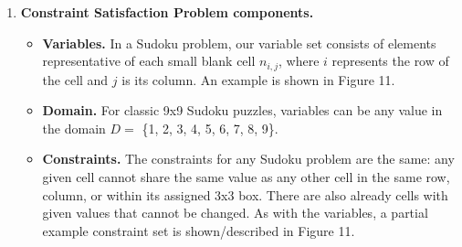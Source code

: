\documentclass[12pt]{article}
\begin{document}
\begin{enumerate}[label=(\alph*)]

    \item \textbf{Constraint Satisfaction Problem components.}
        \begin{itemize}
            \item \textbf{Variables.} In a Sudoku problem, our variable set consists of elements representative of each small blank cell $n_{i,j}$, where $i$ represents the row of the cell and $j$ is its column. An example is shown in Figure 11. 
            \item \textbf{Domain.} For classic 9x9 Sudoku puzzles, variables can be  any value in the domain $D =$  \{1, 2, 3, 4, 5, 6, 7, 8, 9\}.
            \item \textbf{Constraints.} The constraints for any Sudoku problem are the same: any given cell cannot share the same value as any other cell in the same row, column, or within its assigned 3x3 box. There are also already cells with given values that cannot be changed. As with the variables, a partial example constraint set is shown/described in Figure 11.
        \end{itemize}


\end{enumerate}
\end{document}
